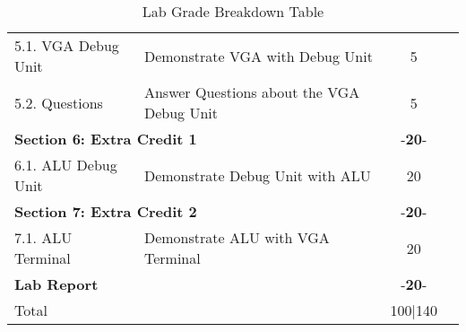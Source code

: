 \documentclass{article}
\begin{document}
\begin{table}[!htb]
\begin{center}
\begin{tabular}[width=0.8\textwidth]{|l|l|c|l|}
       \hline
       5.1. VGA Debug Unit & Demonstrate VGA with Debug Unit & 5 &\\
       5.2. Questions & Answer Questions about the VGA Debug Unit & 5 &\\
       \hline
       \multicolumn{2}{|l}{\textbf{Section 6: Extra Credit 1}}  & -\textbf{20}- &\\
       \hline
       6.1. ALU Debug Unit & Demonstrate Debug Unit with ALU & 20 &\\
       \hline
       \multicolumn{2}{|l}{\textbf{Section 7: Extra Credit 2}}  & -\textbf{20}- &\\
       \hline
       7.1. ALU Terminal & Demonstrate ALU with VGA Terminal & 20 &\\
       \hline
       \multicolumn{2}{|l}{\textbf{Lab Report}}  & -\textbf{20}- &\\
       \hline
       \hline
       \multicolumn{2}{|l}{Total} & \multicolumn{1}{c|}{100|140} &\\
       \hline
    \end{tabular}
  \end{center}
  \caption{Lab Grade Breakdown Table}
\end{table}
\end{document}
